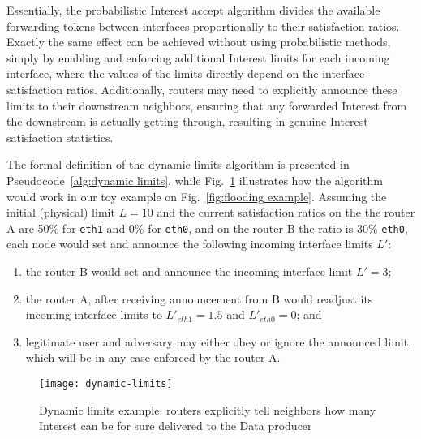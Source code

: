 

Essentially, the probabilistic Interest accept algorithm divides the available forwarding tokens between interfaces proportionally to their satisfaction ratios.
Exactly the same effect can be achieved without using probabilistic methods, simply by enabling and enforcing additional Interest limits for each incoming interface, where the values of the limits directly depend on the interface satisfaction ratios.
Additionally, routers may need to explicitly announce these limits to their downstream neighbors, ensuring that any forwarded Interest from the downstream is actually getting through, resulting in genuine Interest satisfaction statistics.

The formal definition of the dynamic limits algorithm is presented in Pseudocode~\ref{alg:dynamic limits}, while Fig.~\ref{fig:dynamic limits example} illustrates how the algorithm would work in our toy example on Fig.~\ref{fig:flooding example}.
Assuming the initial (physical) limit $L=10$ and the current satisfaction ratios on the the router A are 50\% for \texttt{eth1} and 0\% for \texttt{eth0}, and on the router B the ratio is 30\%  \texttt{eth0}, each node would set and announce the following  incoming interface limits $L'$: 
\begin{enumerate}
\item the router B would set and announce the incoming interface limit $L'=3$;
\item the router A, after receiving announcement from B would readjust its incoming interface limits to $L'_{eth1} = 1.5$ and $L'_{eth0} = 0$; and
\item legitimate user and adversary may either obey or ignore the announced limit, which will be in any case enforced by the router A.
\end{enumerate}


\begin{figure}[htbp]
  \centering
  \texttt{[image: dynamic-limits]}
  \caption{Dynamic limits example: routers explicitly tell neighbors how many Interest can be for sure delivered to the Data producer}
  \label{fig:dynamic limits example}
\end{figure}




